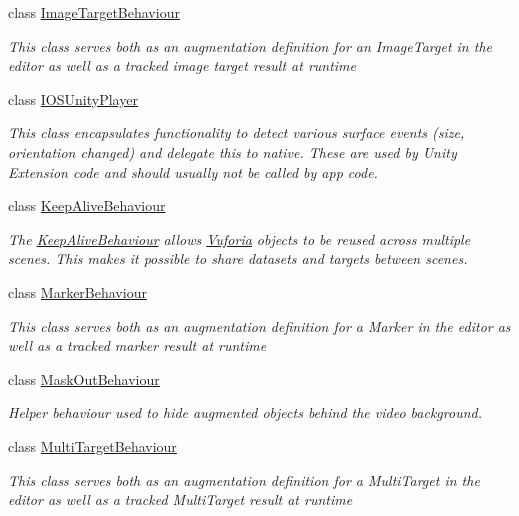 \begin{DoxyCompactItemize}
class \hyperlink{class_vuforia_1_1_image_target_behaviour}{Image\+Target\+Behaviour}
\begin{DoxyCompactList}\small\item\em This class serves both as an augmentation definition for an Image\+Target in the editor as well as a tracked image target result at runtime \end{DoxyCompactList}\item 
class \hyperlink{class_vuforia_1_1_i_o_s_unity_player}{I\+O\+S\+Unity\+Player}
\begin{DoxyCompactList}\small\item\em This class encapsulates functionality to detect various surface events (size, orientation changed) and delegate this to native. These are used by Unity Extension code and should usually not be called by app code. \end{DoxyCompactList}\item 
class \hyperlink{class_vuforia_1_1_keep_alive_behaviour}{Keep\+Alive\+Behaviour}
\begin{DoxyCompactList}\small\item\em The \hyperlink{class_vuforia_1_1_keep_alive_behaviour}{Keep\+Alive\+Behaviour} allows \hyperlink{namespace_vuforia}{Vuforia} objects to be reused across multiple scenes. This makes it possible to share datasets and targets between scenes. \end{DoxyCompactList}\item 
class \hyperlink{class_vuforia_1_1_marker_behaviour}{Marker\+Behaviour}
\begin{DoxyCompactList}\small\item\em This class serves both as an augmentation definition for a Marker in the editor as well as a tracked marker result at runtime \end{DoxyCompactList}\item 
class \hyperlink{class_vuforia_1_1_mask_out_behaviour}{Mask\+Out\+Behaviour}
\begin{DoxyCompactList}\small\item\em Helper behaviour used to hide augmented objects behind the video background. \end{DoxyCompactList}\item 
class \hyperlink{class_vuforia_1_1_multi_target_behaviour}{Multi\+Target\+Behaviour}
\begin{DoxyCompactList}\small\item\em This class serves both as an augmentation definition for a Multi\+Target in the editor as well as a tracked Multi\+Target result at runtime \end{DoxyCompactList}\item 

\end{DoxyCompactItemize}

